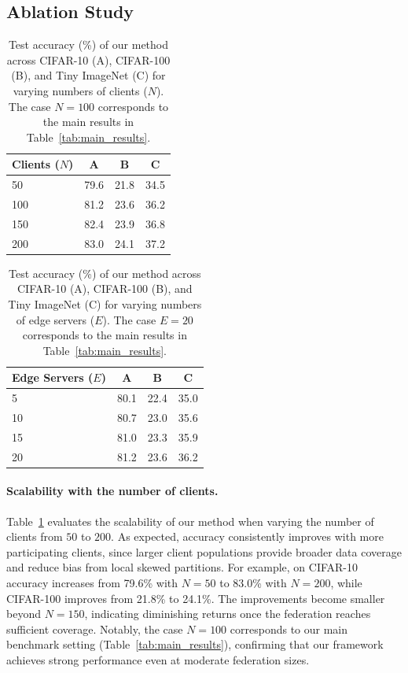 \documentclass[twoside]{article}
\begin{document}
        
    \subsection{Ablation Study}
\begin{table}[t]
\centering
\caption{Test accuracy (\%) of our method across CIFAR-10 (A), CIFAR-100 (B), and Tiny ImageNet (C) for varying numbers of clients ($N$). 
The case $N=100$ corresponds to the main results in Table~\ref{tab:main_results}.}
\label{tab:accuracy_ours}
\begin{tabular}{lccc}
\toprule
Clients ($N$) & A & B & C \\
\midrule
50  & 79.6 & 21.8 & 34.5 \\
100 & 81.2 & 23.6 & 36.2 \\
150 & 82.4 & 23.9 & 36.8 \\
200 & 83.0 & 24.1 & 37.2 \\
\bottomrule
\end{tabular}
\end{table}


\begin{table}[t]
\centering
\caption{Test accuracy (\%) of our method across CIFAR-10 (A), CIFAR-100 (B), and Tiny ImageNet (C) for varying numbers of edge servers ($E$). 
The case $E=20$ corresponds to the main results in Table~\ref{tab:main_results}.}
\label{tab:accuracy_edges}
\begin{tabular}{lccc}
\toprule
Edge Servers ($E$) & A & B & C \\
\midrule
5   & 80.1 & 22.4 & 35.0 \\
10  & 80.7 & 23.0 & 35.6 \\
15  & 81.0 & 23.3 & 35.9 \\
20  & 81.2 & 23.6 & 36.2 \\
\bottomrule
\end{tabular}
\end{table}
\paragraph{Scalability with the number of clients.} 
Table~\ref{tab:accuracy_ours} evaluates the scalability of our method when varying the number of clients from $50$ to $200$. 
As expected, accuracy consistently improves with more participating clients, since larger client populations provide broader data coverage and reduce bias from local skewed partitions. 
For example, on CIFAR-10 accuracy increases from 79.6\% with $N=50$ to 83.0\% with $N=200$, while CIFAR-100 improves from 21.8\% to 24.1\%. 
The improvements become smaller beyond $N=150$, indicating diminishing returns once the federation reaches sufficient coverage. 
Notably, the case $N=100$ corresponds to our main benchmark setting (Table~\ref{tab:main_results}), confirming that our framework achieves strong performance even at moderate federation sizes. 
\end{document}
